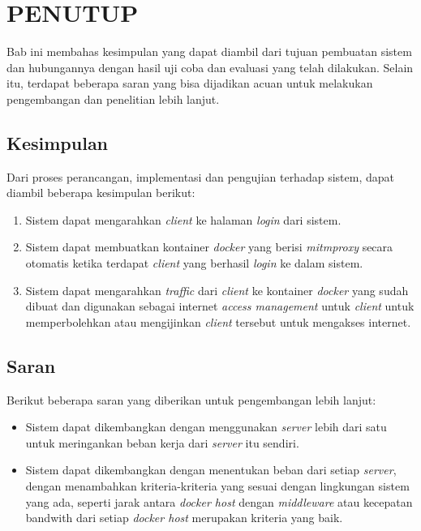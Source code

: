 \chapter{PENUTUP}
  Bab ini membahas kesimpulan yang dapat diambil dari tujuan pembuatan sistem dan hubungannya dengan hasil uji coba dan evaluasi yang telah dilakukan. Selain itu, terdapat beberapa saran yang bisa dijadikan acuan untuk melakukan pengembangan dan penelitian lebih lanjut.
  \section{Kesimpulan}
  Dari proses perancangan, implementasi dan pengujian terhadap sistem, dapat diambil beberapa kesimpulan berikut:
  \begin{enumerate}
  	\item Sistem dapat mengarahkan \textit{client} ke halaman \textit{login} dari sistem.
  	\item Sistem dapat membuatkan kontainer \textit{docker} yang berisi \textit{mitmproxy} secara otomatis ketika terdapat \textit{client} yang berhasil \textit{login} ke dalam sistem.
  	\item Sistem dapat mengarahkan \textit{traffic} dari \textit{client} ke kontainer \textit{docker} yang sudah dibuat dan digunakan sebagai internet \textit{access management} untuk \textit{client} untuk memperbolehkan atau mengijinkan \textit{client} tersebut untuk mengakses internet.     
  \end{enumerate}
  \section{Saran}
  Berikut beberapa saran yang diberikan untuk pengembangan lebih lanjut:
  \begin{itemize}
  	\item Sistem dapat dikembangkan dengan menggunakan \textit{server} lebih dari satu untuk meringankan beban kerja dari \textit{server} itu sendiri.
  	\item Sistem dapat dikembangkan dengan menentukan beban dari setiap \textit{server}, dengan menambahkan kriteria-kriteria yang sesuai dengan lingkungan sistem yang ada, seperti jarak antara \textit{docker host} dengan \textit{middleware} atau kecepatan bandwith dari setiap \textit{docker host} merupakan kriteria yang baik. 
  \end{itemize}


